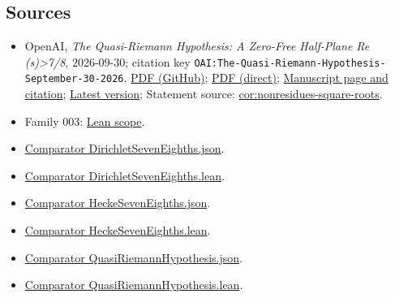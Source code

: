 \documentclass[11pt]{article}
\begin{document}
\subsection{Sources}
\begin{itemize}
\item OpenAI, \emph{The Quasi-Riemann Hypothesis: A Zero-Free Half-Plane Re (s)>7/8}, 2026-09-30; citation key \texttt{OAI:The-Quasi-Riemann-Hypothesis-September-30-2026}. \href{https://github.com/openai/math/blob/adc7f1241b42e322a6451854ab7e4b4c146bf78a/preprints/The-Quasi-Riemann-Hypothesis-September-30-2026/paper.pdf}{PDF (GitHub)}; \href{https://github.com/openai/math/raw/adc7f1241b42e322a6451854ab7e4b4c146bf78a/preprints/The-Quasi-Riemann-Hypothesis-September-30-2026/paper.pdf}{PDF (direct)}; \href{https://github.com/openai/math/blob/adc7f1241b42e322a6451854ab7e4b4c146bf78a/preprints/The-Quasi-Riemann-Hypothesis-September-30-2026/README.md}{Manuscript page and citation}; \href{https://github.com/openai/math/blob/main/preprints/The-Quasi-Riemann-Hypothesis-September-30-2026/paper.pdf}{Latest version}; Statement source: \href{https://github.com/openai/math/blob/adc7f1241b42e322a6451854ab7e4b4c146bf78a/preprints/The-Quasi-Riemann-Hypothesis-September-30-2026/build/paper.tex\#L325}{cor:nonresidues-square-roots}.
\item Family 003: \href{https://github.com/openai/math/blob/adc7f1241b42e322a6451854ab7e4b4c146bf78a/lean/docs/003.md}{Lean scope}.
\item \href{https://github.com/openai/math/blob/adc7f1241b42e322a6451854ab7e4b4c146bf78a/lean/ComparatorChallenges/DirichletSevenEighths.json}{Comparator DirichletSevenEighths.json}.
\item \href{https://github.com/openai/math/blob/adc7f1241b42e322a6451854ab7e4b4c146bf78a/lean/ComparatorChallenges/DirichletSevenEighths.lean}{Comparator DirichletSevenEighths.lean}.
\item \href{https://github.com/openai/math/blob/adc7f1241b42e322a6451854ab7e4b4c146bf78a/lean/ComparatorChallenges/HeckeSevenEighths.json}{Comparator HeckeSevenEighths.json}.
\item \href{https://github.com/openai/math/blob/adc7f1241b42e322a6451854ab7e4b4c146bf78a/lean/ComparatorChallenges/HeckeSevenEighths.lean}{Comparator HeckeSevenEighths.lean}.
\item \href{https://github.com/openai/math/blob/adc7f1241b42e322a6451854ab7e4b4c146bf78a/lean/ComparatorChallenges/QuasiRiemannHypothesis.json}{Comparator QuasiRiemannHypothesis.json}.
\item \href{https://github.com/openai/math/blob/adc7f1241b42e322a6451854ab7e4b4c146bf78a/lean/ComparatorChallenges/QuasiRiemannHypothesis.lean}{Comparator QuasiRiemannHypothesis.lean}.

\end{itemize}
\end{document}
